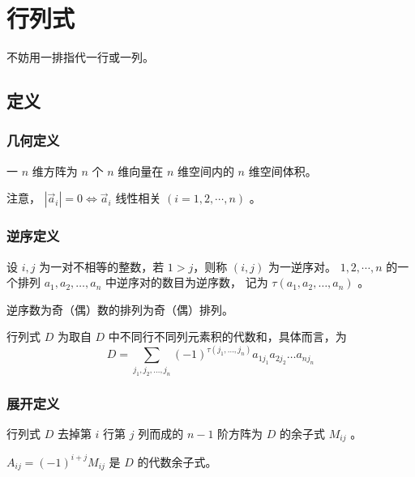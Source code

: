 \chapter{行列式}

不妨用一排指代一行或一列。

\section{定义}

\subsection{几何定义}

\begin{Def}[几何定义]

    一 $ n $ 维方阵为 $ n $ 个 $ n $ 维向量在 $ n $ 维空间内的 $ n $ 维空间体积。
\end{Def}

注意， $ |\vec{a}_i| = 0 \Leftrightarrow \vec{a}_i $ 线性相关 $ (i = 1,2,\cdots,n) $ 。

\subsection{逆序定义}

\begin{Def}[逆序和逆序数]

    设 $ i,j $ 为一对不相等的整数，若 $ 1>j $，则称 $ (i,j) $ 为一逆序对。
    $ 1,2,\cdots,n $ 的一个排列 $ a_1,a_2,\dots,a_n $  中逆序对的数目为逆序数，
    记为 $ \tau(a_1,a_2,\dots,a_n) $ 。

    逆序数为奇（偶）数的排列为奇（偶）排列。
\end{Def}

\begin{Def}[逆序定义]

    行列式 $ D $ 为取自 $ D $ 中不同行不同列元素积的代数和，具体而言，为$$
        D = \sum_{j_1,j_2,\dots,j_n}(-1)^{\tau(j_1,\dots,j_n)}a_{1j_1}a_{2j_2}\dots a_{nj_n}
    $$ 
\end{Def}

\subsection{展开定义}

\begin{Def}[余子式和代数余子式]

    行列式 $ D $ 去掉第 $ i $  行第 $ j $ 列而成的 $ n-1 $ 阶方阵为 $ D $ 的余子式 $ M_{ij} $ 。

    $ A_{ij} = (-1)^{i+j}M_{ij} $ 是 $ D $ 的代数余子式。
\end{Def}

